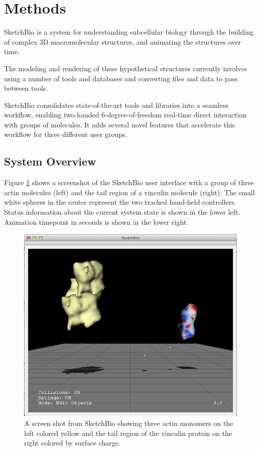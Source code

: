 \documentclass[twocolumn]{bmcart}%
\begin{document}
\section*{Methods}

SketchBio is a system for understanding subcellular biology through the building of complex 3D macromolecular structures, and animating the structures over time.

The modeling and rendering of these hypothetical structures currently involves using a number of tools and databases and converting files and data to pass between tools.

SketchBio consolidates state-of-the-art tools and libraries into a seamless workflow, enabling two-handed 6-degree-of-freedom real-time direct interaction with groups of molecules.  It adds several novel features that accelerate this workflow for three different user groups.

\subsection*{System Overview}

Figure \ref{fig:actin_vinculin} shows a screenshot of the SketchBio user interface with a group of three actin molecules (left) and the tail region of a vinculin molecule (right).  The small white spheres in the center represent the two tracked hand-held controllers. Status information about the current system state is shown in the lower left.  Animation timepoint in seconds is shown in the lower right.

\begin{figure}[ht]
\centering
\includegraphics[width=0.9\columnwidth]{actinVinculin.png}
\caption{A screen shot from SketchBio showing three actin monomers on the left colored yellow and the tail region of the vinculin protein on the right colored by surface charge.}
\label{fig:actin_vinculin}
\end{figure}
\end{document}
